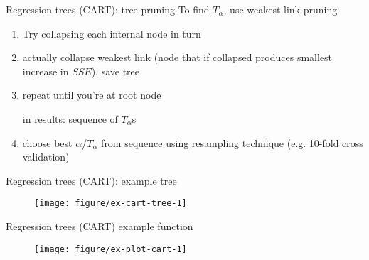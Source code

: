 \documentclass{beamer}
\begin{document}
\begin{frame}[c]{Regression trees (CART): tree pruning}
  To find $T_{\alpha}$, use weakest link pruning
      \begin{enumerate}[<+->]
        \item Try collapsing each internal node in turn
        \item actually collapse weakest link (node that if collapsed produces smallest increase in $SSE$), save tree
        \item repeat until you're at root node 
          \pause
          
          in results: sequence of $T_{\alpha}$s  
        \item choose best $\alpha$/$T_{\alpha}$ from sequence using resampling technique (e.g. 10-fold cross validation)
      \end{enumerate}
\end{frame}

\begin{frame}[c]{Regression trees (CART): example tree}
  \begin{figure}[!htbp]
  \begin{center}
    \texttt{[image: figure/ex-cart-tree-1]}
  \end{center}
  \end{figure}
\end{frame}

\begin{frame}{Regression trees (CART) example function}
  \begin{figure}[!htbp]
  \begin{center}
    \texttt{[image: figure/ex-plot-cart-1]}
  \end{center}
  \end{figure}
\end{frame}

%
\end{document}
